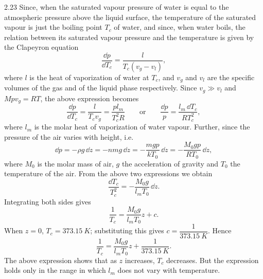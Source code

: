 \begin{solution}{2.23}
Since, when the saturated vapour pressure of water is equal to the atmospheric pressure above the
liquid surface, the temperature of the saturated vapour is just the boiling point $T_c$ of water,
and since, when water boils, the relation between its saturated vapour pressure and the
temperature is given by the Clapeyron equation
\begin{equation*}
\frac{\dd p}{\dd T_c} = \frac{l}{T_c\left(v_g-v_l\right)},
\end{equation*}
where $l$ is the heat of vaporization of water at $T_c$, and $v_g$ and $v_l$ are the specific
volumes of the gas and of the liquid phase respectively. Since $v_g\gg v_l$ and $Mpv_g=RT$, the
above expression becomes
\begin{equation*}
\frac{\dd p}{\dd T_c} = \frac{l}{T_cv_g}
= \frac{pl_m}{T_c^2R}
\qquad\text{or}\qquad
\frac{\dd p}{p} = \frac{l_m\,\dd T_c}{RT_c^2},
\end{equation*}
where $l_m$ is the molar heat of vaporization of water vapour. Further, since the pressure of the
air varies with height, i.e.
\begin{equation*}
\dd p = -\rho g\,\dd z = -nmg\,\dd z = -\frac{mgp}{kT_0}\,\dd z
= -\frac{M_0gp}{RT_0}\,\dd z,
\end{equation*}
where $M_0$ is the molar mass of air, $g$ the acceleration of gravity and $T_0$ the temperature
of the air. From the above two expressions we obtain
\begin{equation*}
\frac{\dd T_c}{T_c^2} = -\frac{M_0g}{l_mT_0}\,\dd z .
\end{equation*}
Integrating both sides gives
\begin{equation*}
\frac{1}{T_c} = \frac{M_0g}{l_mT_0}z + c .
\end{equation*}
When $z=0$, $T_c=\SI{373.15}{K}$; substituting this gives
$c=\dfrac{1}{\SI{373.15}{K}}$. Hence
\begin{equation*}
\frac{1}{T_c} = \frac{M_0g}{l_mT_0}z + \frac{1}{\SI{373.15}{K}} .
\end{equation*}
The above expression shows that as $z$ increases, $T_c$ decreases. But the expression holds only
in the range in which $l_m$ does not vary with temperature.
\end{solution}

